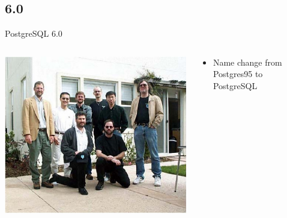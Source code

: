 \documentclass[t,10pt]{beamer}
\begin{document}
\subsection{6.0}
\begin{frame}{PostgreSQL 6.0}
  \begin{columns}[T]
    \begin{column}{0.3\textwidth}
      \includegraphics[width=1.1\textwidth,keepaspectratio=true]{assets/Get_to_know_PostgreSQL-6-team}
    \end{column}
    \begin{column}{0.7\textwidth}
      \begin{itemize}%
      \item Name change from Postgres95 to PostgreSQL
      \end{itemize}
    \end{column}
  \end{columns}
\end{frame}
\end{document}
